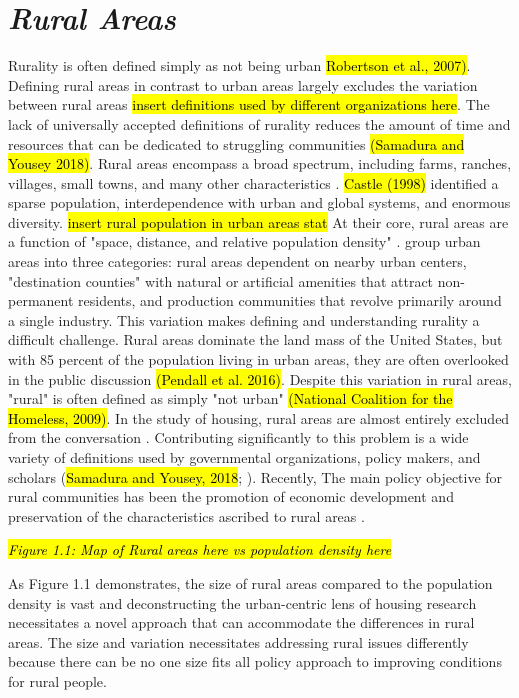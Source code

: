 \section{\textit{Rural Areas}}
 Rurality is often defined simply as not being urban \hl{Robertson et al., 2007)}. Defining rural areas in contrast to urban areas largely excludes the variation between rural areas \hl{insert definitions used by different organizations here}.   The lack of universally accepted definitions of rurality reduces the amount of time and resources that can be dedicated to struggling communities \hl{(Samadura and Yousey 2018)}. Rural areas encompass a broad spectrum, including farms, ranches, villages, small towns, and many other characteristics \citep{cromartie_defining_2008}.  \hl{Castle (1998)} identified a sparse population, interdependence with urban and global systems, and enormous diversity. 
 \hl{insert rural population in urban areas stat} At their core, rural areas are a function of "space, distance, and relative population density" \citep[?]{castle_place_2011}.\citet{shoup_principles_2010} group urban areas into three categories: rural areas dependent on nearby urban centers, "destination counties" with natural or artificial amenities that attract non-permanent residents, and production communities that revolve primarily around a single industry. This variation  makes defining and understanding rurality a difficult challenge. Rural areas dominate the land mass of the United States, but with 85 percent of the population living in urban areas, they are often overlooked in the public discussion \hl{(Pendall et al. 2016)}. Despite this variation in rural areas,  "rural" is often defined as simply "not urban" \hl{(National Coalition for the Homeless, 2009)}. In the study of housing, rural areas are almost entirely excluded from the conversation \citep{gkartzios_housing_2017}. Contributing significantly to this problem is a wide variety of definitions used by governmental organizations, policy makers, and scholars (\hl{Samadura and Yousey, 2018}; \citealp{cromartie_defining_2008}). Recently, The main policy objective for rural communities has been the promotion of economic development and preservation of the characteristics ascribed to rural areas \citep{lichter_changing_2007}. 

\textit{\hl{Figure 1.1: Map of Rural areas here vs population density here}} %

As Figure 1.1 demonstrates, the size of rural areas compared to the population density is vast and deconstructing the urban-centric lens of housing research necessitates a novel approach that can accommodate the differences in rural areas. The size and variation necessitates addressing rural issues differently because there can be no one size fits all policy approach to improving conditions for rural people. 

